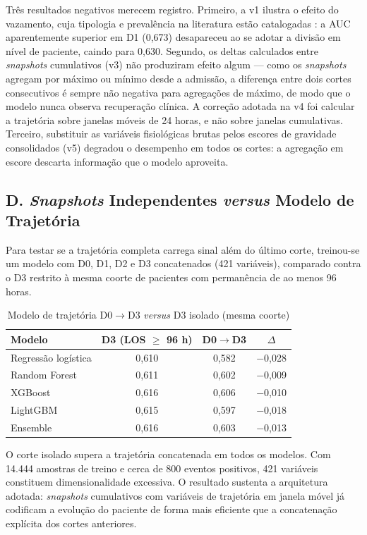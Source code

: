 \documentclass{ieeeaccess}
\begin{document}
Três resultados negativos merecem registro. Primeiro, a v1 ilustra o efeito do vazamento, cuja tipologia e prevalência na literatura estão catalogadas \cite{Kapoor2023}: a AUC aparentemente superior em D1 (0,673) desapareceu ao se adotar a divisão em nível de paciente, caindo para 0,630. Segundo, os deltas calculados entre \textit{snapshots} cumulativos (v3) não produziram efeito algum --- como os \textit{snapshots} agregam por máximo ou mínimo desde a admissão, a diferença entre dois cortes consecutivos é sempre não negativa para agregações de máximo, de modo que o modelo nunca observa recuperação clínica. A correção adotada na v4 foi calcular a trajetória sobre janelas móveis de 24 horas, e não sobre janelas cumulativas. Terceiro, substituir as variáveis fisiológicas brutas pelos escores de gravidade consolidados (v5) degradou o desempenho em todos os cortes: a agregação em escore descarta informação que o modelo aproveita.

\subsection*{D. \textit{Snapshots} Independentes \textit{versus} Modelo de Trajetória}
Para testar se a trajetória completa carrega sinal além do último corte, treinou-se um modelo com D0, D1, D2 e D3 concatenados (421 variáveis), comparado contra o D3 restrito à mesma coorte de pacientes com permanência de ao menos 96 horas.

\begin{table}[!t]
\caption{Modelo de trajetória D0$\rightarrow$D3 \textit{versus} D3 isolado (mesma coorte)}
\label{tab:trajetoria}
\centering
\small
\begin{tabular}{lccc}
\hline
\textbf{Modelo} & \textbf{D3 (LOS $\geq$ 96 h)} & \textbf{D0$\rightarrow$D3} & \textbf{$\Delta$} \\
\hline
Regressão logística & 0,610 & 0,582 & $-$0,028 \\
Random Forest       & 0,611 & 0,602 & $-$0,009 \\
XGBoost             & 0,616 & 0,606 & $-$0,010 \\
LightGBM            & 0,615 & 0,597 & $-$0,018 \\
Ensemble            & 0,616 & 0,603 & $-$0,013 \\
\hline
\end{tabular}
\end{table}

O corte isolado supera a trajetória concatenada em todos os modelos. Com 14.444 amostras de treino e cerca de 800 eventos positivos, 421 variáveis constituem dimensionalidade excessiva. O resultado sustenta a arquitetura adotada: \textit{snapshots} cumulativos com variáveis de trajetória em janela móvel já codificam a evolução do paciente de forma mais eficiente que a concatenação explícita dos cortes anteriores.
\end{document}
